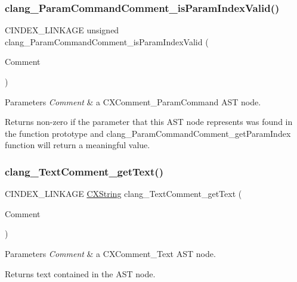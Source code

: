 \subsubsection{\texorpdfstring{clang\+\_\+\+Param\+Command\+Comment\+\_\+is\+Param\+Index\+Valid()}{clang\_ParamCommandComment\_isParamIndexValid()}}
{\footnotesize\ttfamily C\+I\+N\+D\+E\+X\+\_\+\+L\+I\+N\+K\+A\+GE unsigned clang\+\_\+\+Param\+Command\+Comment\+\_\+is\+Param\+Index\+Valid (\begin{DoxyParamCaption}\item[{\hyperlink{structCXComment}{C\+X\+Comment}}]{Comment }\end{DoxyParamCaption})}


\begin{DoxyParams}{Parameters}
{\em Comment} & a {\ttfamily C\+X\+Comment\+\_\+\+Param\+Command} A\+ST node.\\
\hline
\end{DoxyParams}
\begin{DoxyReturn}{Returns}
non-\/zero if the parameter that this A\+ST node represents was found in the function prototype and {\ttfamily clang\+\_\+\+Param\+Command\+Comment\+\_\+get\+Param\+Index} function will return a meaningful value. 
\end{DoxyReturn}
\mbox{\label{group__CINDEX__COMMENT_gae9a27e851356181beac36bbff6e638e2}} 
\subsubsection{\texorpdfstring{clang\+\_\+\+Text\+Comment\+\_\+get\+Text()}{clang\_TextComment\_getText()}}
{\footnotesize\ttfamily C\+I\+N\+D\+E\+X\+\_\+\+L\+I\+N\+K\+A\+GE \hyperlink{structCXString}{C\+X\+String} clang\+\_\+\+Text\+Comment\+\_\+get\+Text (\begin{DoxyParamCaption}\item[{\hyperlink{structCXComment}{C\+X\+Comment}}]{Comment }\end{DoxyParamCaption})}


\begin{DoxyParams}{Parameters}
{\em Comment} & a {\ttfamily C\+X\+Comment\+\_\+\+Text} A\+ST node.\\
\hline
\end{DoxyParams}
\begin{DoxyReturn}{Returns}
text contained in the A\+ST node. 
\end{DoxyReturn}
\mbox{\label{group__CINDEX__COMMENT_ga88371156eeeb768d0d14eb5630b7c726}} 
